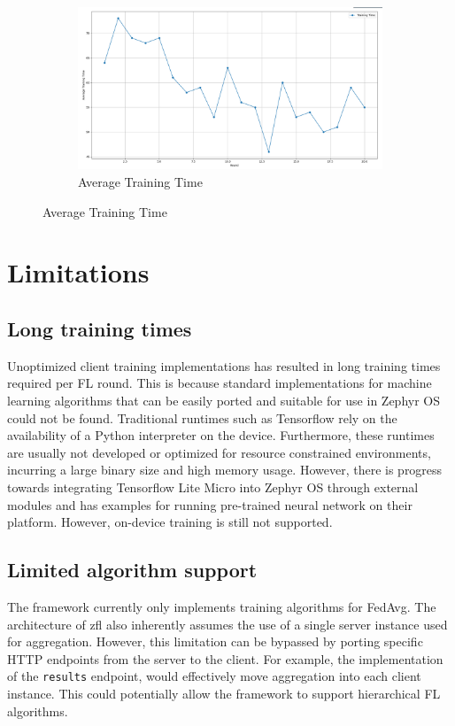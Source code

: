 \documentclass[12pt]{article}
\begin{document}
\begin{figure}[hbt!]
\begin{subfigure}[b]{\linewidth}
  \includegraphics[width=\linewidth]{training_time}
  \caption{Average Training Time}
  \label{fig:training_time}
\end{subfigure}
\end{figure}

\section{Limitations}
\subsection{Long training times}
Unoptimized client training implementations has resulted in long training times required per FL
round. This is because standard implementations for machine learning
algorithms that can be easily ported and suitable for use in Zephyr OS could not be found.
Traditional runtimes such as Tensorflow\cite{tensorflow2015-whitepaper} rely on the availability of a Python interpreter on
the device. Furthermore, these runtimes are usually not developed or optimized for resource
constrained environments, incurring a large binary size and high memory usage. However, there is
progress towards integrating Tensorflow Lite Micro into Zephyr OS through external modules
and has examples for running pre-trained neural network on their platform. However, on-device
training is still not supported.

\subsection{Limited algorithm support}
The framework currently only implements training algorithms for FedAvg. The architecture of zfl also
inherently assumes the use of a single server instance used for aggregation. However, this
limitation can be bypassed by porting specific HTTP endpoints from the server to the client. For
example, the implementation of the \verb|results| endpoint, would effectively move aggregation into
each client instance. This could potentially allow the framework to support hierarchical FL
algorithms\cite{rana_2023_hierarchical}.\\
\end{document}
